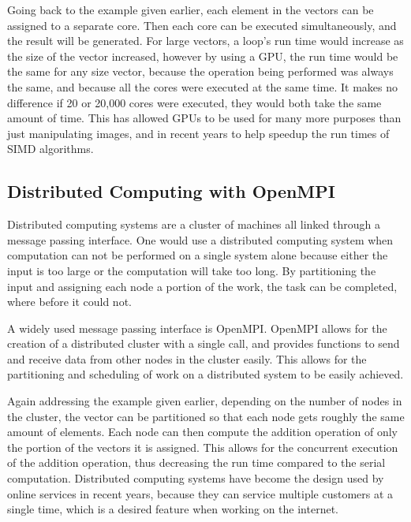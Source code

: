 Going back to the example given earlier, each element in the vectors can be assigned to a separate core. Then each core can be executed simultaneously, and the result will be generated. For large vectors, a loop's run time would increase as the size of the vector increased, however by using a GPU, the run time would be the same for any size vector, because the operation being performed was always the same, and because all the cores were executed at the same time. It makes no difference if 20 or 20,000 cores were executed, they would both take the same amount of time. This has allowed GPUs to be used for many more purposes than just manipulating images, and in recent years to help speedup the run times of SIMD algorithms.

\subsection{Distributed Computing with OpenMPI}
Distributed computing systems are a cluster of machines all linked through a message passing interface. One would use a distributed computing system when computation can not be performed on a single system alone because either the input is too large or the computation will take too long. By partitioning the input and assigning each node a portion of the work, the task can be completed, where before it could not.

A widely used message passing interface is OpenMPI. OpenMPI allows for the creation of a distributed cluster with a single call, and provides functions to send and receive data from other nodes in the cluster easily. This allows for the partitioning and scheduling of work on a distributed system to be easily achieved.

Again addressing the example given earlier, depending on the number of nodes in the cluster, the vector can be partitioned so that each node gets roughly the same amount of elements. Each node can then compute the addition operation of only the portion of the vectors it is assigned. This allows for the concurrent execution of the addition operation, thus decreasing the run time compared to the serial computation. Distributed computing systems have become the design used by online services in recent years, because they can service multiple customers at a single time, which is a desired feature when working on the internet.